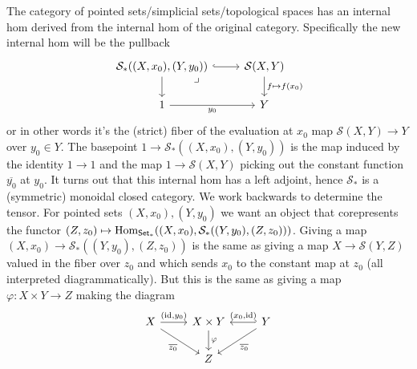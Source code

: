 The category of pointed sets/simplicial sets/topological spaces has an internal hom derived from the internal hom of the original category. Specifically the new internal hom will be the pullback
\[
\begin{tikzcd}
\mathcal{S}_*((X, x_0), (Y, y_0)) \arrow[r, hook] \arrow[d] \arrow[dr, phantom, "\lrcorner" very near start] & \mathcal{S}(X, Y) \arrow[d, "f \mapsto f(x_0)"] \\
1 \arrow[r, "y_0"'] & Y
\end{tikzcd}
\]
or in other words it's the (strict) fiber of the evaluation at \(x_0\) map \(\mathcal{S}(X, Y) \to Y\) over \(y_0 \in Y\). The basepoint \(1 \to \mathcal{S}_*((X, x_0), (Y, y_0))\) is the map induced by the identity \(1 \to 1\) and the map \(1 \to \mathcal{S}(X, Y)\) picking out the constant function \(\overline{y_0}\) at \(y_0\). It turns out that this internal hom has a left adjoint, hence \(\mathcal{S}_*\) is a (symmetric) monoidal closed category. We work backwards to determine the tensor. For pointed sets \((X, x_0), (Y, y_0)\) we want an object that corepresents the functor \((Z, z_0) \mapsto \operatorname{Hom}_{\mathsf{Set}_*}((X, x_0), \mathcal{S}_*((Y, y_0), (Z, z_0)))\). Giving a map \((X, x_0) \to \mathcal{S}_*((Y, y_0), (Z, z_0))\) is the same as giving a map \(X \to \mathcal{S}(Y, Z)\) valued in the fiber over \(z_0\) and which sends \(x_0\) to the constant map at \(z_0\) (all interpreted diagrammatically). But this is the same as giving a map \(\varphi : X \times Y \to Z\) making the diagram
\[
\begin{tikzcd}
X \arrow[r, "{(\id, y_0)}"] \arrow[dr, "\overline{z_0}"'] & X \times Y \arrow[d, "\varphi"] & Y \arrow[l, hook', "{(x_0, \id)}"'] \arrow[dl, "\overline{z_0}"] \\
& Z &
\end{tikzcd}
\]
